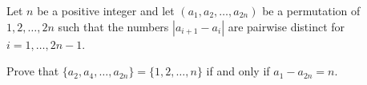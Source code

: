Let $n$ be a positive integer and let $(a_1,a_2,\ldots ,a_{2n})$ be a permutation of $1,2,\ldots ,2n$ such that the numbers $|a_{i+1}-a_i|$ are pairwise distinct for $i=1,\ldots ,2n-1$.

Prove that $\{a_2,a_4,\ldots ,a_{2n}\}=\{1,2,\ldots ,n\}$ if and only if $a_1-a_{2n}=n$.